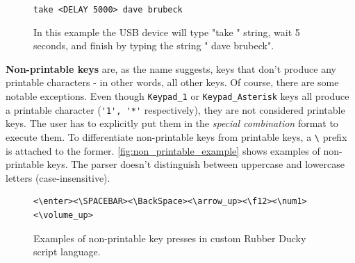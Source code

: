 \begin{figure}[ht]
\centering
\begin{varwidth}{\linewidth}
\verb|take <DELAY 5000> dave brubeck|
\end{varwidth}
\caption{In this example the USB device will type "take " string, wait 5 seconds, and finish by typing the string " dave brubeck".}
\label{fig:delay_example}
\end{figure}

\textbf{Non-printable keys} are, as the name suggests, keys that don't produce any printable characters \-- in other words, all other keys. Of course, there are some notable exceptions. Even though \verb|Keypad_1| or \verb|Keypad_Asterisk| keys all produce a printable character (\verb|'1', '*'| respectively), they are not considered printable keys. The user has to explicitly put them in the \emph{special combination} format to execute them. To differentiate non-printable keys from printable keys, a \verb|\| prefix is attached to the former. \autoref{fig:non_printable_example} shows examples of non-printable keys. The parser doesn't distinguish between uppercase and lowercase letters (case-insensitive).

\begin{figure}[ht]
\centering
\begin{varwidth}{\linewidth}
\begin{verbatim}
<\enter><\SPACEBAR><\BackSpace><\arrow_up><\f12><\num1><\volume_up>
\end{verbatim}
\end{varwidth}
\caption{Examples of non-printable key presses in custom Rubber Ducky script language.}
\label{fig:non_printable_example}
\end{figure}

